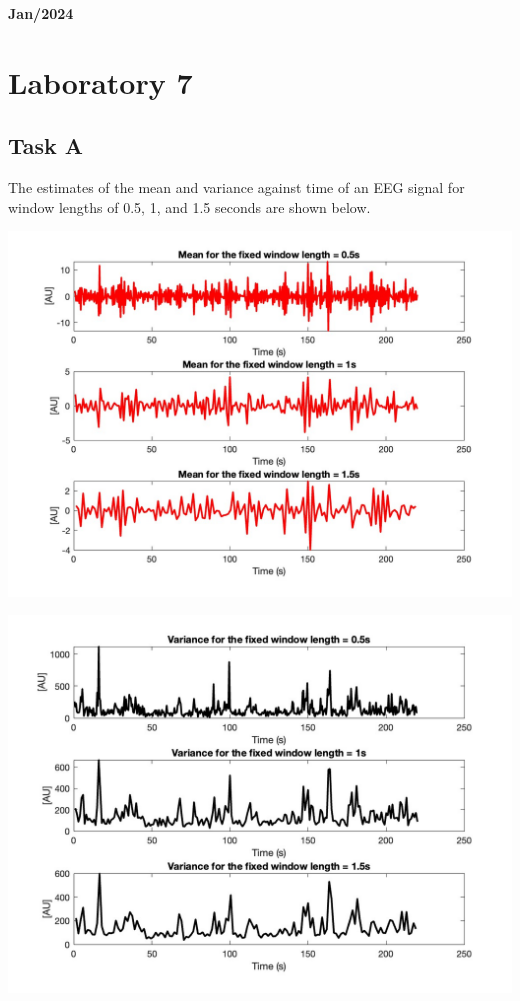\documentclass[8pt]{article}  %
\theoremstyle{plain}
\theoremstyle{definition}
\theoremstyle{remark}
\begin{document}
    
    \small{}
    \begin{flushright}
    \textbf{Jan/2024}
    \end{flushright}




    \section{Laboratory 7}
    \subsection{Task A}
    The estimates of the mean and variance against time of an EEG signal for window lengths of 0.5, 1, 
    and 1.5 seconds are shown below.

   \begin{minipage}{0.5\textwidth}  
    \centering  
    \includegraphics[width=\linewidth]{figure/figure_1.jpg}  
    \end{minipage}
    \hfill
    \begin{minipage}{0.48\textwidth}  
    \centering  
    \includegraphics[width=\linewidth]{figure/figure_2.jpg}  
    \end{minipage}
\end{document}
